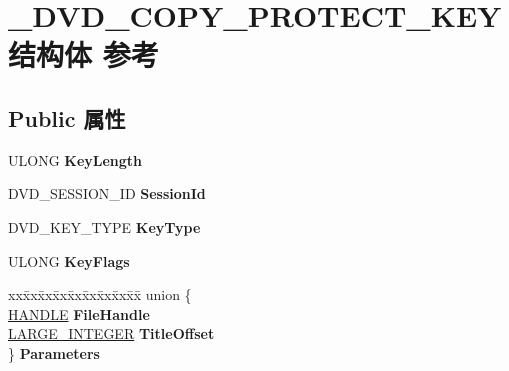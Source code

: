 \hypertarget{struct___d_v_d___c_o_p_y___p_r_o_t_e_c_t___k_e_y}{}\section{\+\_\+\+D\+V\+D\+\_\+\+C\+O\+P\+Y\+\_\+\+P\+R\+O\+T\+E\+C\+T\+\_\+\+K\+E\+Y结构体 参考}
\label{struct___d_v_d___c_o_p_y___p_r_o_t_e_c_t___k_e_y}
\subsection*{Public 属性}
\begin{DoxyCompactItemize}
\item 
\mbox{\label{struct___d_v_d___c_o_p_y___p_r_o_t_e_c_t___k_e_y_a0ba0f21e70daad8f596d1526f41e8f7b}} 
U\+L\+O\+NG {\bfseries Key\+Length}
\item 
\mbox{\label{struct___d_v_d___c_o_p_y___p_r_o_t_e_c_t___k_e_y_a7fe89a9e61eeeaf5ed1c7dff646d3752}} 
D\+V\+D\+\_\+\+S\+E\+S\+S\+I\+O\+N\+\_\+\+ID {\bfseries Session\+Id}
\item 
\mbox{\label{struct___d_v_d___c_o_p_y___p_r_o_t_e_c_t___k_e_y_acaae549fdb8c8be6aa4d78d695cd9b7c}} 
D\+V\+D\+\_\+\+K\+E\+Y\+\_\+\+T\+Y\+PE {\bfseries Key\+Type}
\item 
\mbox{\label{struct___d_v_d___c_o_p_y___p_r_o_t_e_c_t___k_e_y_ac76d76b8ee3fa0d938c97a89305f6b07}} 
U\+L\+O\+NG {\bfseries Key\+Flags}
\item 
\mbox{\label{struct___d_v_d___c_o_p_y___p_r_o_t_e_c_t___k_e_y_a0f179160ddc1fd21cbd542ff2449ee5d}} 
\begin{tabbing}
xx\=xx\=xx\=xx\=xx\=xx\=xx\=xx\=xx\=\kill
union \{\\
\>\hyperlink{interfacevoid}{HANDLE} {\bfseries FileHandle}\\
\>\hyperlink{union___l_a_r_g_e___i_n_t_e_g_e_r}{LARGE\_INTEGER} {\bfseries TitleOffset}\\
\} {\bfseries Parameters}\\


\end{tabbing}
\end{DoxyCompactItemize}
